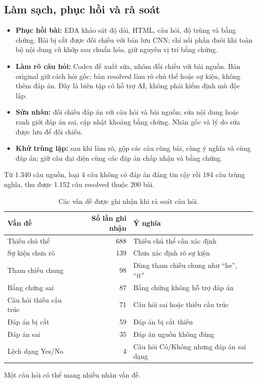 \subsection{Làm sạch, phục hồi và rà soát}
\begin{itemize}
\item \textbf{Phục hồi bài:} EDA khảo sát độ dài, HTML, câu hỏi, độ trùng và bằng chứng. Bài bị cắt được đối chiếu với bản lưu CNN; chỉ nối phần đuôi khi toàn bộ nội dung cũ khớp sau chuẩn hóa, giữ nguyên vị trí bằng chứng.
\item \textbf{Làm rõ câu hỏi:} Codex đề xuất sửa, nhóm đối chiếu với bài nguồn. Bản original giữ cách hỏi gốc; bản resolved làm rõ chủ thể hoặc sự kiện, không thêm đáp án. Đây là biên tập có hỗ trợ AI, không phải kiểm định mù độc lập.
\item \textbf{Sửa nhãn:} đối chiếu đáp án với câu hỏi và bài nguồn; sửa nội dung hoặc ranh giới đáp án sai, cập nhật khoảng bằng chứng. Nhãn gốc và lý do sửa được lưu để đối chiếu.
\item \textbf{Khử trùng lặp:} sau khi làm rõ, gộp các câu cùng bài, cùng ý nghĩa và cùng đáp án; giữ câu đại diện cùng các đáp án chấp nhận và bằng chứng.
\end{itemize}
Từ 1.340 câu nguồn, loại 4 câu không có đáp án đáng tin cậy rồi 184 câu trùng nghĩa, thu được 1.152 câu resolved thuộc 200 bài.
\begin{table}[H]\small
  \centering
  \caption{Các vấn đề được ghi nhận khi rà soát câu hỏi.}
  \label{tab:question-review-issues}
  \begin{tabularx}{\textwidth}{@{}l r X@{}}
    \toprule
    \textbf{Vấn đề} & \textbf{Số lần ghi nhận} & \textbf{Ý nghĩa} \\
    \midrule
    Thiếu chủ thể & 688 & Thiếu chủ thể cần xác định \\
    Sự kiện chưa rõ & 139 & Chưa xác định rõ sự kiện \\
    Tham chiếu chung & 98 & Dùng tham chiếu chung như ``he'', ``it'' \\
    Bằng chứng sai & 87 & Bằng chứng không hỗ trợ đáp án \\
    Câu hỏi thiếu cấu trúc & 71 & Câu hỏi sai hoặc thiếu cấu trúc \\
    Đáp án bị cắt & 59 & Đáp án bị cắt thiếu \\
    Đáp án sai & 35 & Đáp án nguồn không đúng \\
    Lệch dạng Yes/No & 4 & Câu hỏi Có/Không nhưng đáp án sai dạng \\
    \bottomrule
  \end{tabularx}

  \vspace{1mm}
  {\footnotesize Một câu hỏi có thể mang nhiều nhãn vấn đề.}
\end{table}

